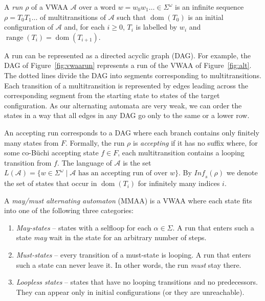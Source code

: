 \documentclass{llncs}
\newcommand{\mA}{\mathcal{A}}
\newcommand{\Inf}{\mathit{Inf\!}}
\DeclareMathOperator*{\range}{{range}}
\DeclareMathOperator*{\dom}{{dom}}
\begin{document}
A \emph{run} $\rho$ of a VWAA $\mA$ over a word $w = w_0w_1\ldots \in
\Sigma^\omega$ is an infinite sequence $\rho=T_0T_1\ldots$ of multitransitions of
$\mA$ such that $\dom(T_0)$ is an initial configuration of $\mA$ and, for
each $i\ge 0$, $T_i$ is labelled by $w_i$ and $\range(T_i) =
\dom(T_{i+1})$. 

A run can be represented as a directed acyclic graph (DAG).  For example,
the DAG of Figure~\ref{fig:vwaarun} represents a run of the VWAA of
Figure~\ref{fig:alt}.  The dotted lines divide the DAG into segments
corresponding to multitransitions.  Each transition of a multitransition is
represented by edges leading across the corresponding segment from the
starting state to states of the target configuration. As our alternating
automata are very weak, we can order the states in a way that all edges
in any DAG go only to the same or a lower row.

An accepting run corresponds to a DAG where each branch contains only
finitely many states from $F$.  Formally, the run $\rho$ is \emph{accepting}
if it has no suffix where, for some co-B\"{u}chi accepting state $f\in F$,
each multitransition contains a looping transition from $f$. The language of
$\mA$ is the set $L(\mA)=\{w\in\Sigma^\omega\mid\mA\text{ has an accepting
  run of over }w\}$.  By $\Inf_s(\rho)$ we denote the set of states that
occur in $\dom(T_i)$ for infinitely many indices $i$.





\begin{definition}\label{def:mmaa}
  A \emph{may/must alternating automaton} (MMAA)
  is a VWAA where each state fits into one of the following three
  categories:
  \begin{enumerate}
  \item \emph{May-states} -- states with a selfloop for each
    $\alpha\in\Sigma$.  A run that enters such a state \emph{may} wait in
    the state for an arbitrary number of steps.
  \item \emph{Must-states} -- every transition of a must-state is looping. A
    run that enters such a state can never leave it. In other words, the run
    \emph{must} stay there.
  \item \emph{Loopless states} -- states that have no looping transitions
    and no predecessors. They can appear only in initial configurations (or
    they are unreachable).
  \end{enumerate}
\end{definition}
\end{document}
